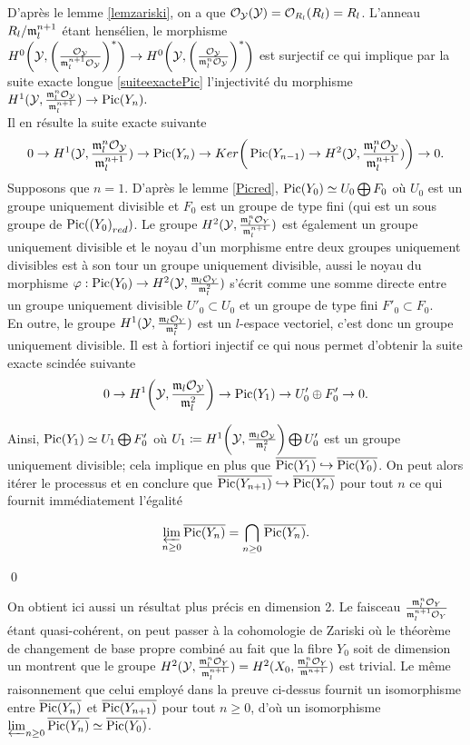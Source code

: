 \documentclass[11pt]{article}
\begin{document}
D'après le lemme \ref{lemzariski}, on a que $\mathcal{O}_{\mathcal{Y}}(\mathcal{Y})= \mathcal{O}_{R_l}(R_l) = R_l$.
L'anneau $R_l/\mathfrak{m}^{n+1}_l$ étant hensélien, le morphisme $H^0\bigg(\mathcal{Y},\bigg(\frac{\mathcal{O}_{\mathcal{Y}} }{\mathfrak{m}^{n+1}_l \mathcal{O}_{\mathcal{Y}}}\bigg)^*\bigg)  \rightarrow H^0\bigg(\mathcal{Y},\bigg(\frac{\mathcal{O}_{\mathcal{Y}} }{\mathfrak{m}^{n}_l \mathcal{O}_{\mathcal{Y}}}\bigg)^*\bigg)$ est surjectif ce qui implique par la suite exacte longue \ref{suiteexactePic} l'injectivité du morphisme $H^1(\mathcal{Y},\frac{\mathfrak{m}^n_l \mathcal{O}_{\mathcal{Y}} }{\mathfrak{m}^{n+1}_l}) \rightarrow \operatorname{Pic}(Y_n).$ \\
 Il en résulte la suite exacte suivante
 $$
 0 \rightarrow H^1(\mathcal{Y},\frac{\mathfrak{m}^n_l \mathcal{O}_{\mathcal{Y}} }{\mathfrak{m}^{n+1}_l}) \rightarrow \operatorname{Pic}(Y_n) \rightarrow Ker\bigg( \operatorname{Pic}(Y_{n-1}) \rightarrow H^2(\mathcal{Y},\frac{\mathfrak{m}^n_l \mathcal{O}_{\mathcal{Y}} }{\mathfrak{m}^{n+1}_l}) \bigg) \rightarrow 0.
 $$
Supposons que $n=1$. D'après le lemme \ref{Picred}, $\operatorname{Pic}(Y_0) \simeq U_0 \bigoplus F_0$ où $U_0$ est un groupe uniquement divisible et $F_0$ est un groupe de type fini (qui est un sous groupe de $\operatorname{Pic}({(Y_0)}_{red})$. 
 Le groupe $H^2(\mathcal{Y},\frac{\mathfrak{m}^n_l \mathcal{O}_Y }{\mathfrak{m}^{n+1}_l})$ est également un groupe uniquement divisible et le noyau d'un morphisme entre deux groupes uniquement divisibles est à son tour un groupe uniquement divisible, aussi le noyau du morphisme $\varphi : \operatorname{Pic}(Y_0) \rightarrow H^2(\mathcal{Y},\frac{\mathfrak{m}_l \mathcal{O}_Y }{\mathfrak{m}^{2}_l})$ s'écrit comme une somme directe entre un groupe uniquement divisible $U'_0 \subset U_0$ et un groupe de type fini $F'_0 \subset F_0$.\\
En outre, le groupe $H^1(\mathcal{Y},\frac{\mathfrak{m}_l \mathcal{O}_Y }{\mathfrak{m}^{2}_l})$ est un $l$-espace vectoriel, c'est donc un groupe uniquement divisible. Il est à fortiori injectif ce qui nous permet d'obtenir la suite exacte scindée suivante 
 $$
0 \rightarrow H^1\bigg(\mathcal{Y},\frac{\mathfrak{m}_l \mathcal{O}_{\mathcal{Y}} }{\mathfrak{m}^{2}_l}\bigg) \rightarrow \operatorname{Pic}(Y_1) \rightarrow U'_0 \oplus F'_0 \rightarrow 0.
 $$

Ainsi, $\operatorname{Pic}(Y_1)\simeq U_1 \bigoplus F'_0$ où $U_1 \coloneqq H^1\bigg(\CY,\frac{\fm_l \CO_\CY }{\fm^{2}_l}\bigg) \bigoplus U'_0$ est un groupe uniquement divisible; cela implique en plus que $\overline{\operatorname{Pic}(Y_1)} \hookrightarrow \overline{\operatorname{Pic}(Y_0)}$. On peut alors itérer le processus et en conclure que $\overline{\operatorname{Pic}(Y_{n+1})} \hookrightarrow \overline{\operatorname{Pic}(Y_n)}$ pour tout $n$ ce qui fournit immédiatement l'égalité

$$\varprojlim_{n \geq 0} \overline{\operatorname{Pic}(Y_n)} = \bigcap_{n \geq 0} \overline{\operatorname{Pic}(Y_n)}.$$
 
 \qed

\rmke On obtient ici aussi un résultat plus précis en dimension 2. Le faisceau $\frac{\mathfrak{m}^n_l \mathcal{O}_Y }{\mathfrak{m}^{n+1}_l \mathcal{O}_Y}$ étant quasi-cohérent, on peut passer à la cohomologie de Zariski où le théorème de changement de base propre combiné au fait que la fibre $Y_0$ soit de dimension un montrent que le groupe $H^2(\mathcal{Y},\frac{\mathfrak{m}^n_l \mathcal{O}_Y }{\mathfrak{m}^{n+1}_l}) = H^2(X_0,\frac{\mathfrak{m}^n_l \mathcal{O}_Y }{\mathfrak{m}^{n+1}}) $ est trivial.
Le même raisonnement que celui employé dans la preuve ci-dessus fournit un isomorphisme entre $\overline{\operatorname{Pic}(Y_n)}$ et $\overline{\operatorname{Pic}(Y_{n+1})}$ pour tout $n \geq 0$, d'où un isomorphisme $\varprojlim_{n \geq 0} \overline{\operatorname{Pic}(Y_n)} \simeq \overline{\operatorname{Pic}(Y_0)}$.\\
\end{document}
